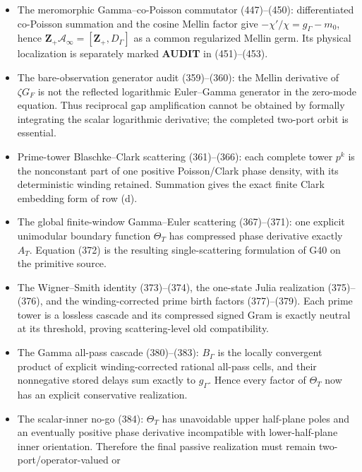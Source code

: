 \documentclass[11pt]{article}
\newcommand{\AUDIT}{\textcolor{orange!75!black}{\textbf{AUDIT}}}
\begin{document}
\begin{itemize}
      amplitude \(h\), with cancellation of the two bare \(QF\) terms.
      Equation (445) is the fully explicit observed Gamma--Tate transport
      equation.
\item The meromorphic Gamma--co-Poisson commutator (447)--(450): differentiated
      co-Poisson summation and the cosine Mellin factor give
      \(-\chi'/\chi=g_\Gamma-m_0\), hence
      \(\mathbf Z_+\mathcal A_\infty=[\mathbf Z_+,D_\Gamma]\) as a common
      regularized Mellin germ.  Its physical localization is separately
      marked \AUDIT{} in (451)--(453).
\item The bare-observation generator audit (359)--(360): the Mellin
      derivative of $\zeta G_F$ is not the reflected logarithmic
      Euler--Gamma generator in the zero-mode equation.  Thus reciprocal gap
      amplification cannot be obtained by formally integrating the scalar
      logarithmic derivative; the completed two-port orbit is essential.
\item Prime-tower Blaschke--Clark scattering (361)--(366): each complete
      tower $p^k$ is the nonconstant part of one positive Poisson/Clark phase
      density, with its deterministic winding retained.  Summation gives the
      exact finite Clark embedding form of row (d).
\item The global finite-window Gamma--Euler scattering (367)--(371): one
      explicit unimodular boundary function $\Theta_T$ has compressed phase
      derivative exactly $A_T$.  Equation (372) is the resulting
      single-scattering formulation of G40 on the primitive source.
\item The Wigner--Smith identity (373)--(374), the one-state Julia
      realization (375)--(376), and the winding-corrected prime birth factors
      (377)--(379).  Each prime tower is a lossless cascade and its compressed
      signed Gram is exactly neutral at its threshold, proving scattering-level
      old compatibility.
\item The Gamma all-pass cascade (380)--(383): $B_\Gamma$ is the locally
      convergent product of explicit winding-corrected rational all-pass
      cells, and their nonnegative stored delays sum exactly to $g_\Gamma$.
      Hence every factor of $\Theta_T$ now has an explicit conservative
      realization.
\item The scalar-inner no-go (384): $\Theta_T$ has unavoidable upper
      half-plane poles and an eventually positive phase derivative
      incompatible with lower-half-plane inner orientation.  Therefore the
      final passive realization must remain two-port/operator-valued or

\end{itemize}
\end{document}
